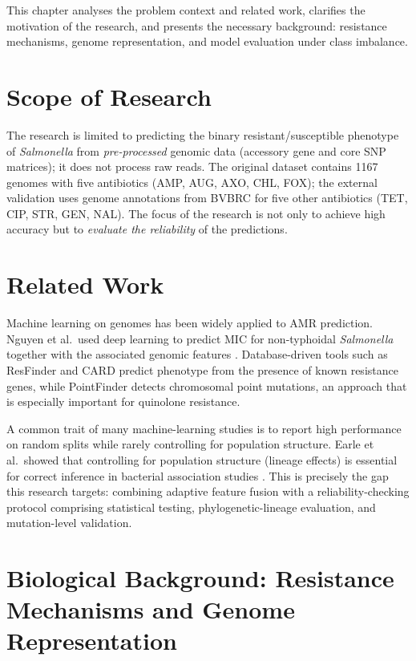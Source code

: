 \documentclass[../main.tex]{subfiles}
\begin{document}
This chapter analyses the problem context and related work, clarifies the motivation of the research, and presents the necessary background: resistance mechanisms, genome representation, and model evaluation under class imbalance.

\section{Scope of Research}

The research is limited to predicting the binary resistant/susceptible phenotype of \textit{Salmonella} from \textit{pre-processed} genomic data (accessory gene and core SNP matrices); it does not process raw reads. The original dataset contains 1167 genomes with five antibiotics (AMP, AUG, AXO, CHL, FOX); the external validation uses genome annotations from \gls{BVBRC} for five other antibiotics (TET, CIP, STR, GEN, NAL). The focus of the research is not only to achieve high accuracy but to \textit{evaluate the reliability} of the predictions.

\section{Related Work}

Machine learning on genomes has been widely applied to AMR prediction. Nguyen et al.\ used deep learning to predict MIC for non-typhoidal \textit{Salmonella} together with the associated genomic features \cite{nguyen2019using}. Database-driven tools such as ResFinder \cite{bortolaia2020resfinder} and CARD \cite{alcock2023card} predict phenotype from the presence of known resistance genes, while PointFinder \cite{zankari2017pointfinder} detects chromosomal point mutations, an approach that is especially important for quinolone resistance.

A common trait of many machine-learning studies is to report high performance on random splits while rarely controlling for population structure. Earle et al.\ showed that controlling for population structure (lineage effects) is essential for correct inference in bacterial association studies \cite{earle2016identifying}. This is precisely the gap this research targets: combining adaptive feature fusion with a reliability-checking protocol comprising statistical testing, phylogenetic-lineage evaluation, and mutation-level validation.

\section{Biological Background: Resistance Mechanisms and Genome Representation}
\end{document}
